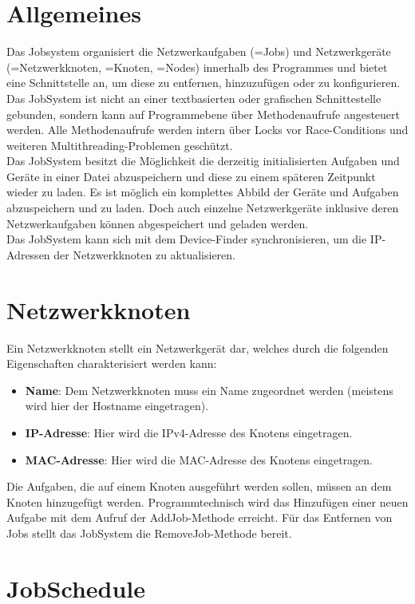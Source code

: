 \documentclass[12pt,a4paper]{report}
\begin{document}
\begin{onehalfspace}
\section{Allgemeines}

Das Jobsystem organisiert die Netzwerkaufgaben (=Jobs) und Netzwerkgeräte (=Netzwerkknoten, =Knoten, =Nodes) innerhalb des Programmes und bietet eine Schnittstelle an, um diese zu entfernen, hinzuzufügen oder zu konfigurieren. Das JobSystem ist nicht an einer textbasierten oder grafischen Schnittestelle gebunden, sondern kann auf Programmebene über Methodenaufrufe angesteuert werden. Alle Methodenaufrufe werden intern über Locks vor Race-Conditions und weiteren Multithreading-Problemen geschützt.\\
Das JobSystem besitzt die Möglichkeit die derzeitig initialisierten Aufgaben und Geräte in einer Datei abzuspeichern und diese zu einem späteren Zeitpunkt wieder zu laden. Es ist möglich ein komplettes Abbild der Geräte und Aufgaben abzuspeichern und zu laden. Doch auch einzelne Netzwerkgeräte inklusive deren Netzwerkaufgaben können abgespeichert und geladen werden.\\
Das JobSystem kann sich mit dem Device-Finder synchronisieren, um die IP-Adressen der Netzwerkknoten zu aktualisieren.

\section{Netzwerkknoten}

Ein Netzwerkknoten stellt ein Netzwerkgerät dar, welches durch die folgenden Eigenschaften charakterisiert werden kann:

\begin{itemize}
\item \textbf{Name}: Dem Netzwerkknoten muss ein Name zugeordnet werden (meistens wird hier der Hostname eingetragen).
\item \textbf{IP-Adresse}: Hier wird die IPv4-Adresse des Knotens eingetragen.
\item \textbf{MAC-Adresse}: Hier wird die MAC-Adresse des Knotens eingetragen.
\end{itemize}

Die Aufgaben, die auf einem Knoten ausgeführt werden sollen, müssen an dem Knoten hinzugefügt werden. Programmtechnisch wird das Hinzufügen einer neuen Aufgabe mit dem Aufruf der AddJob-Methode erreicht. Für das Entfernen von Jobs stellt das JobSystem die RemoveJob-Methode bereit.

\section{JobSchedule}


\end{onehalfspace}
\end{document}
